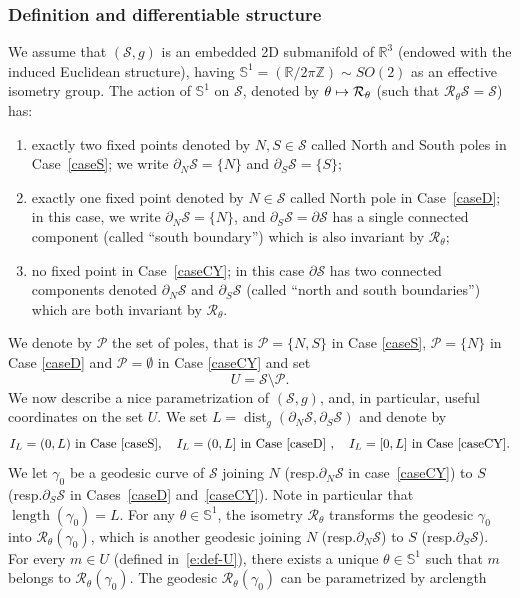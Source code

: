 \documentclass[10pt]{amsart}
\newcommand\mto{\mathchoice{\longmapsto}{\mapsto}{\mapsto}{\mapsto}}
\theoremstyle{definition}
\newcommand{\calR}{\ensuremath{\mathcal R}}
\renewcommand{\P}{\ensuremath{\mathcal P}}
\newcommand{\calS}{\ensuremath{\mathcal S}}
\newcommand{\mb}[1]{\ensuremath{\mathbb{#1}}}
\newcommand{\R}{{\mb{R}}}
\newcommand{\bS}{\ensuremath{\mathbb S}}
\newcommand{\Z}{\mathbb Z}
\DeclareMathOperator{\dist}{dist}
\DeclareMathOperator{\length}{length}
\let\d\partial
\providecommand{\resp}{resp.}\providecommand{\cf}{cf.}
\begin{document}
\subsubsection*{Definition and differentiable structure}
We assume that $(\calS, g)$ is an embedded 2D submanifold of $\R^3$ (endowed with the induced Euclidean structure), having $\bS^1 = (\R/2\pi\Z) \sim SO(2)$ as an effective isometry group.
The action of $\bS^1$ on $\calS$, denoted by $\theta \mto \calR_\theta$ (such that $\calR_\theta \calS = \calS$) has:
\begin{enumerate}
\item exactly two fixed points denoted by $N, S \in \calS$ called North and South poles in Case~\ref{caseS}; we write $\d_N \calS = \{N\}$ and $\d_S \calS = \{S\}$;
\item exactly one fixed point denoted by $N \in \calS$ called North pole in Case~\ref{caseD}; in this case, we write $\d_N \calS = \{N\}$, and $\d_S \mathcal{S} = \d\mathcal{S}$ has a single connected component (called ``south boundary'') which is also invariant by $\calR_\theta$;
\item no fixed point in Case~\ref{caseCY}; in this case $\d\mathcal{S}$ has two connected components denoted $\d_N\calS$ and $\d_S\calS$ (called ``north and south boundaries'') which are both invariant by $\calR_\theta$.
\end{enumerate}
We denote by $\mathcal{P}$ the set of poles, that is $\P=\{N,S\}$ in Case \ref{caseS}, $\mathcal{P}=\{N\}$ in Case \ref{caseD} and $\mathcal{P}=\emptyset$ in Case \ref{caseCY} and set
\begin{equation}
\label{e:def-U}
U =\calS \setminus \P.
\end{equation}
We now describe a nice parametrization of $(\calS, g)$, and, in particular, useful coordinates on the set $U$. We set $L= \dist_g(\d_N \calS, \d_S \calS)$ and denote by
\begin{equation}
\label{e:def-IL}
I_L=(0,L) \text{ in Case \ref{caseS}}, \quad I_L=(0,L] \text{ in Case \ref{caseD} }, \quad I_L=[0,L] \text{ in Case \ref{caseCY}}.
\end{equation}
We let $\gamma_0$ be a geodesic curve of $\calS$ joining $N$ (\resp $\d_N \calS$ in case~\ref{caseCY}) to $S$ (\resp $\d_S \calS$ in Cases~\ref{caseD} and~\ref{caseCY}). Note in particular that $\length(\gamma_0) = L$. For any $\theta \in \bS^1$, the isometry $\calR_\theta$ transforms the geodesic $\gamma_0$ into $\calR_\theta (\gamma_0)$, which is another geodesic joining $N$ (\resp $\d_N \calS$) to $S$ (\resp $\d_S \calS$). For every $m \in U$ (defined in~\eqref{e:def-U}), there exists a unique $\theta \in \bS^1$ such that $m$ belongs to $\calR_\theta (\gamma_0)$. The geodesic $\calR_\theta (\gamma_0)$ can be parametrized by arclength
\end{document}
